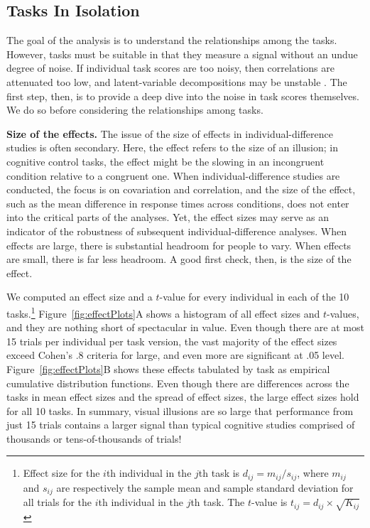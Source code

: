 \documentclass[man, 12pt]{apa7} %
\begin{document}
\subsection{Tasks In Isolation}

The goal of the analysis is to understand the relationships among the tasks. However, tasks must be suitable in that they measure a signal without an undue degree of noise. If individual task scores are too noisy, then correlations are attenuated too low, and latent-variable decompositions may be unstable \parencite[]{Rouder.etal.2023}. The first step, then, is to provide a deep dive into the noise in task scores themselves. We do so before considering the relationships among tasks.

{\bf Size of the effects.}  The issue of the size of effects in individual-difference studies is often secondary. Here, the effect refers to the size of an illusion; in cognitive control tasks, the effect might be the slowing in an incongruent condition relative to a congruent one. When individual-difference studies are conducted, the focus is on covariation and correlation, and the size of the effect, such as the mean difference in response times across conditions, does not enter into the critical parts of the analyses. Yet, the effect sizes may serve as an indicator of the robustness of subsequent individual-difference analyses. When effects are large, there is substantial headroom for people to vary. When effects are small, there is far less headroom. A good first check, then, is the size of the effect.


We computed an effect size and a $t$-value for every individual in each of the 10 tasks.\footnote{Effect size for the $i$th individual in the $j$th task is $d_{ij}=m_{ij}/s_{ij}$, where $m_{ij}$ and $s_{ij}$ are respectively the sample mean and sample standard deviation for all trials for the $i$th individual in the $j$th task.  The $t$-value is $t_{ij}=d_{ij}\times\sqrt{K_{ij}}$}  Figure~\ref{fig:effectPlots}A shows a histogram of all effect sizes and $t$-values, and they are nothing short of spectacular in value.  Even though there are at most 15 trials per individual per task version, the vast majority of the effect sizes exceed Cohen's .8 criteria for large, and even more are significant at .05 level.  Figure~\ref{fig:effectPlots}B shows these effects tabulated by task as empirical cumulative distribution functions.  Even though there are differences across the tasks in mean effect sizes and the spread of effect sizes, the large effect sizes hold for all 10 tasks.  In summary, visual illusions are so large that performance from just 15 trials contains a larger signal than typical cognitive studies comprised of thousands or tens-of-thousands of trials!     
\end{document}
